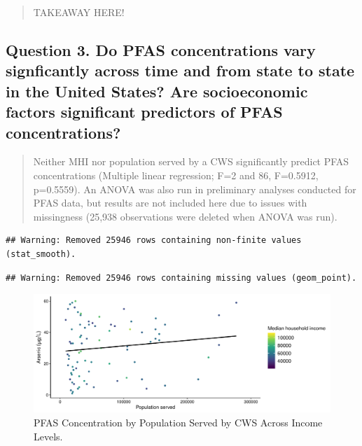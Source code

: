 \documentclass[12pt,]{article}
\begin{document}
\begin{quote}
TAKEAWAY HERE!
\end{quote}

\hypertarget{question-3.-do-pfas-concentrations-vary-signficantly-across-time-and-from-state-to-state-in-the-united-states-are-socioeconomic-factors-significant-predictors-of-pfas-concentrations}{%
\subsection{Question 3. Do PFAS concentrations vary signficantly across
time and from state to state in the United States? Are socioeconomic
factors significant predictors of PFAS
concentrations?}\label{question-3.-do-pfas-concentrations-vary-signficantly-across-time-and-from-state-to-state-in-the-united-states-are-socioeconomic-factors-significant-predictors-of-pfas-concentrations}}

\begin{quote}
Neither MHI nor population served by a CWS significantly predict PFAS
concentrations (Multiple linear regression; F=2 and 86, F=0.5912,
p=0.5559). An ANOVA was also run in preliminary analyses conducted for
PFAS data, but results are not included here due to issues with
missingness (25,938 observations were deleted when ANOVA was run).
\end{quote}

\begin{verbatim}
## Warning: Removed 25946 rows containing non-finite values (stat_smooth).
\end{verbatim}

\begin{verbatim}
## Warning: Removed 25946 rows containing missing values (geom_point).
\end{verbatim}

\begin{figure}
\centering
\includegraphics{Project_Template_files/figure-latex/figs12-1.pdf}
\caption{PFAS Concentration by Population Served by CWS Across Income
Levels.}
\end{figure}
\end{document}
